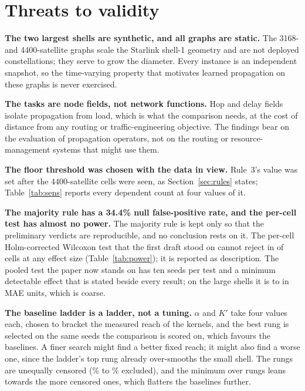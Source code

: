 \documentclass[preprint,11pt,3p]{elsarticle}
\begin{document}
\section{Threats to validity}
\label{sec:threats}

\textbf{The two largest shells are synthetic, and all graphs are static.} The 3168- and
4400-satellite graphs scale the Starlink shell-1 geometry and are not deployed constellations;
they serve to grow the diameter. Every instance is an independent snapshot, so the time-varying
property that motivates learned propagation on these graphs is never exercised.

\textbf{The tasks are node fields, not network functions.} Hop and delay fields isolate
propagation from load, which is what the comparison needs, at the cost of distance from any
routing or traffic-engineering objective. The findings bear on the evaluation of propagation
operators, not on the routing or resource-management systems that might use them.

\textbf{The floor threshold was chosen with the data in view.} Rule~3's value was set after the
4400-satellite cells were seen, as Section~\ref{sec:rules} states; Table~\ref{tab:sens} reports
every dependent count at four values of it.

\textbf{The majority rule has a 34.4\% null false-positive rate, and the per-cell test has
almost no power.} The majority rule is kept only so that the preliminary verdicts are
reproducible, and no conclusion rests on it. The per-cell Holm-corrected Wilcoxon test that the
first draft stood on cannot reject in \numPowerCannotReject{} of \numGthreeArmCells{} cells at
any effect size (Table~\ref{tab:power}); it is reported as description. The pooled test the
paper now stands on has ten seeds per test and a minimum detectable effect that is stated beside
every result; on the large shells it is \numPooledMdeLargeMin{} to \numPooledMdeMax{} in MAE
units, which is coarse.

\textbf{The baseline ladder is a ladder, not a tuning.} $\alpha$ and $K'$ take four values each,
chosen to bracket the measured reach of the kernels, and the best rung is selected on the same
seeds the comparison is scored on, which favours the baselines. A finer search might find a
better fixed reach; it might also find a worse one, since the ladder's top rung already
over-smooths the small shell. The rungs are unequally censored (\numLadderExclMinPct\% to
\numLadderExclMaxPct\% excluded), and the minimum over rungs leans towards the more censored
ones, which flatters the baselines further.
\end{document}
